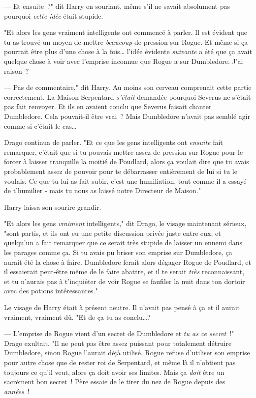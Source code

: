 --- Et ensuite~?" dit Harry en souriant, même s'il ne savait absolument pas pourquoi \emph{cette idée} était stupide.

"Et alors les gens vraiment intelligents ont commencé à parler. Il est évident que tu as trouvé un moyen de mettre \emph{beaucoup} de pression sur Rogue. Et même si ça pourrait être plus d'une chose à la fois… l'idée évidente \emph{suivante} a été que ça avait quelque chose à voir avec l'emprise inconnue que Rogue a sur Dumbledore. J'ai raison~?

--- Pas de commentaire," dit Harry. Au moins son cerveau comprenait cette partie correctement. La Maison Serpentard \emph{s'était} demandée pourquoi Severus ne s'était pas fait renvoyer. Et ils en avaient conclu que Severus faisait chanter Dumbledore. Cela pouvait-il être vrai~? Mais Dumbledore n'avait pas semblé agir comme si c'était le cas…

Drago continua de parler. "Et ce que les gens intelligents ont \emph{ensuite} fait remarquer, c'était que si tu pouvais mettre assez de pression sur Rogue pour le forcer à laisser tranquille la moitié de Poudlard, alors ça voulait dire que tu avais probablement assez de pouvoir pour te débarrasser entièrement de lui si tu le voulais. Ce que tu lui as fait subir, c'est une humiliation, tout comme il a essayé de t'humilier - mais tu nous as laissé notre Directeur de Maison."

Harry laissa son sourire grandir.

"Et alors les gens \emph{vraiment} intelligents," dit Drago, le visage maintenant sérieux, "sont partis, et ils ont eu une petite discussion privée juste entre eux, et quelqu'un a fait remarquer que ce serait très stupide de laisser un ennemi dans les parages comme ça. Si tu avais pu briser son emprise sur Dumbledore, ça aurait été la chose à faire. Dumbledore ferait alors dégager Rogue de Poudlard, et il essaierait peut-être même de le faire abattre, et il te serait \emph{très} reconnaissant, et tu n'aurais pas à t'inquiéter de voir Rogue se faufiler la nuit dans ton dortoir avec des potions intéressantes."

Le visage de Harry était à présent neutre. Il n'avait pas pensé à ça et il aurait vraiment, vraiment dû. "Et de ça tu as conclu…?

--- L'emprise de Rogue vient d'un secret de Dumbledore et \emph{tu as ce secret}~!" Drago exultait. "Il ne peut pas être assez puissant pour totalement détruire Dumbledore, sinon Rogue l'aurait déjà utilisé. Rogue refuse d'utiliser son emprise pour autre chose que de rester roi de Serpentard, et même là il n'obtient pas toujours ce qu'il veut, alors ça doit avoir ses limites. Mais ça \emph{doit} être un sacrément bon secret~! Père essaie de le tirer du nez de Rogue depuis des \emph{années}~!


